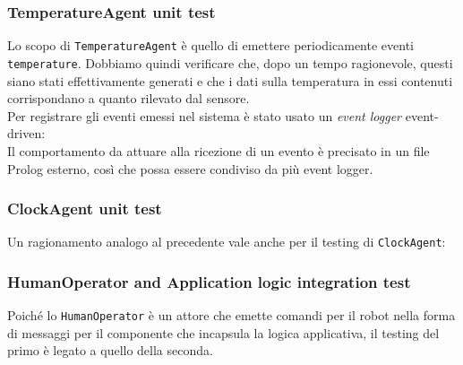 \documentclass{../llncs}
\newcommand{\codescript}[1]{{\mbox{\small{\texttt{#1}}}}\xspace}
\begin{document}


\subsubsection{TemperatureAgent unit test}
Lo scopo di \codescript{TemperatureAgent} è quello di emettere periodicamente eventi \codescript{temperature}. Dobbiamo quindi verificare che, dopo un tempo ragionevole, questi siano stati effettivamente generati e che i dati sulla temperatura in essi contenuti corrispondano a quanto rilevato dal sensore.\\



Per registrare gli eventi emessi nel sistema è stato usato un \emph{event logger} event-driven:\\





Il comportamento da attuare alla ricezione di un evento è precisato in un file Prolog esterno, così che possa essere condiviso da più event logger.\\



\subsubsection{ClockAgent unit test}
Un ragionamento analogo al precedente vale anche per il testing di \codescript{ClockAgent}:\\



\subsubsection{HumanOperator and Application logic integration test}
Poiché lo \codescript{HumanOperator} è un attore che emette comandi per il robot nella forma di messaggi per il componente che incapsula la logica applicativa, il testing del primo è legato a quello della seconda.
\end{document}
